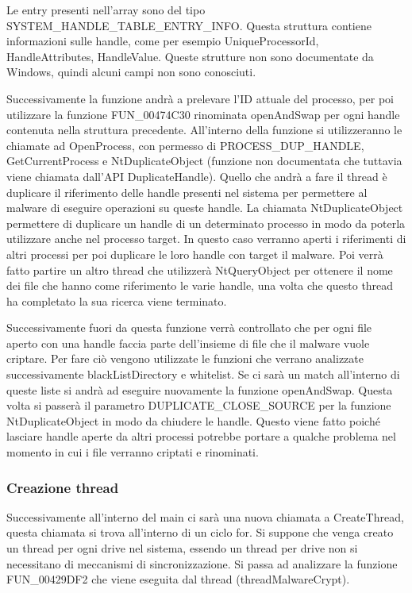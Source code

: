 \documentclass[a4paper,12pt]{article}
\begin{document}
Le entry presenti nell'array sono del tipo \\SYSTEM\_HANDLE\_TABLE\_ENTRY\_INFO. Questa struttura contiene informazioni sulle handle, come per esempio UniqueProcessorId, HandleAttributes, HandleValue. Queste strutture non sono documentate da Windows, quindi alcuni campi non sono conosciuti. 

Successivamente la funzione andrà a prelevare l'ID attuale del processo, per poi utilizzare la funzione FUN\_00474C30 rinominata openAndSwap per ogni handle contenuta nella struttura precedente. All'interno della funzione si utilizzeranno le chiamate ad OpenProcess, con permesso di PROCESS\_DUP\_HANDLE, GetCurrentProcess e NtDuplicateObject (funzione non documentata che tuttavia viene chiamata dall'API DuplicateHandle). Quello che andrà a fare il thread è duplicare il riferimento delle handle presenti nel sistema per permettere al malware di eseguire operazioni su queste handle. La chiamata NtDuplicateObject permettere di duplicare un handle di un determinato processo in modo da poterla utilizzare anche nel processo target. In questo caso verranno aperti i riferimenti di altri processi per poi duplicare le loro handle con target il malware.  Poi verrà fatto partire un altro thread che utilizzerà NtQueryObject per ottenere il nome dei file che hanno come riferimento le varie handle, una volta che questo thread ha completato la sua ricerca viene terminato.

Successivamente fuori da questa funzione verrà controllato che per ogni file aperto con una handle faccia parte dell'insieme di file che il malware vuole criptare. Per fare ciò vengono utilizzate le funzioni che verrano analizzate successivamente blackListDirectory e whitelist. Se ci sarà un match all'interno di queste liste si andrà ad eseguire nuovamente la funzione openAndSwap. Questa volta si passerà il parametro DUPLICATE\_CLOSE\_SOURCE per la funzione NtDuplicateObject in modo da chiudere le handle. Questo viene fatto poiché lasciare handle aperte da altri processi potrebbe portare a qualche problema nel momento in cui i file verranno criptati e rinominati.

\subsubsection{Creazione thread }
Successivamente all'interno del main ci sarà una nuova chiamata a CreateThread, questa chiamata si trova all'interno di un ciclo for. Si suppone che venga creato un thread per ogni drive nel sistema, essendo un thread per drive non si necessitano di meccanismi di sincronizzazione. Si passa ad analizzare la funzione FUN\_00429DF2 che viene eseguita dal thread (threadMalwareCrypt). 
\end{document}
